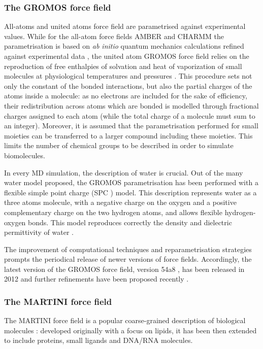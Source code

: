 \documentclass[graybox]{svmult}
\begin{document}
\subsubsection{The GROMOS force field}
All-atoms and united atoms force field are parametrised against experimental values.
%
While for the all-atom force fields AMBER and CHARMM the parametrisation is based on \emph{ab initio} quantum mechanics calculations refined against experimental data \cite{Maier2015,Dickson2014,Wang2004_amber,MacKerell1998,Klauda2010}, the united atom GROMOS force field relies on the reproduction of free enthalpies of solvation and heat of vaporization of small molecules at physiological temperatures and pressures \cite{Oostenbrink2005,Schmid2011,Reif2013}.
%
This procedure sets not only the constant of the bonded interactions, but also the partial charges of the atoms inside a molecule: as no electrons are included for the sake of efficiency, their redistribution across atoms which are bonded is modelled through fractional charges assigned to each atom (while the total charge of a molecule must sum to an integer).
%
Moreover, it is assumed that the parametrisation performed for small moieties can be transferred to a larger compound including these moieties. This limits the number of chemical groups to be described in order to simulate biomolecules.

In every MD simulation, the description of water is crucial. Out of the many water model proposed, the GROMOS parametrisation has been performed with a flexible simple point charge (SPC \cite{Berendsen1981}) model. This description represents water as a three atoms molecule, with a negative charge on the oxygen and a positive complementary charge on the two hydrogen atoms, and allows flexible hydrogen-oxygen bonds. This model reproduces correctly the density and dielectric permittivity of water \cite{Mark2001}.

The improvement of computational techniques and reparametrisation strategies prompts the periodical release of newer versions of force fields. Accordingly, the latest version of the GROMOS force field, version 54a8 \cite{Reif2012}, has been released in 2012 and further refinements have been proposed recently \cite{Margreitter2017,Marzuoli2019}.

\subsubsection{The MARTINI force field}

The MARTINI force field is a popular coarse-grained description of biological molecules \cite{Marrink2007,Monticelli2008,DeJong2013}: developed originally with a focus on lipids, it has been then extended to include proteins, small ligands and DNA/RNA molecules.
\end{document}
